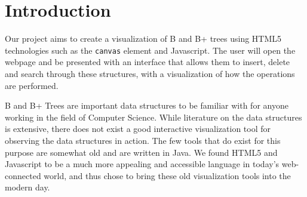 \section{Introduction}
Our project aims to create a visualization of B and B+ trees using HTML5
technologies such as the \texttt{canvas} element and Javascript. The user will open the
webpage and be presented with an interface that allows them to insert, delete
and search through these structures, with a visualization of how the
operations are performed.

B and B+ Trees are important data structures to be familiar with for
anyone working in the field of Computer Science. While literature on
the data structures is extensive, there does not exist a good
interactive visualization tool for observing the data structures in
action. The few tools that do exist for this purpose are somewhat old
and are written in Java. We found HTML5 and Javascript to be a much
more appealing and accessible language in today's web-connected world,
and thus chose to bring these old visualization tools into the modern day.

